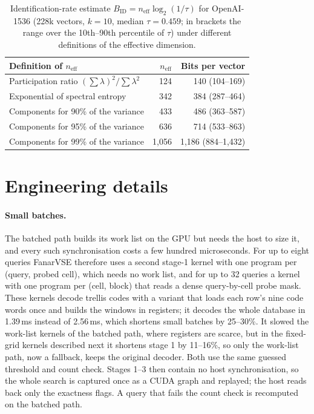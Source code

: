 \documentclass[10pt]{article}
\begin{document}
\begin{table}[!htbp]
\caption{Identification-rate estimate $B_{\mathrm{ID}}=n_{\mathrm{eff}}\log_2(1/\tau)$ for OpenAI-1536 (228k vectors, $k=10$, median $\tau=0.459$; in brackets the range over the 10th--90th percentile of $\tau$) under different definitions of the effective dimension.}
\label{tab:ident}
\small
\begin{tabular}{lrr}
\toprule
Definition of $n_{\mathrm{eff}}$ & $n_{\mathrm{eff}}$ & Bits per vector \\
\midrule
Participation ratio $(\sum\lambda)^2/\sum\lambda^2$ & 124 & 140 (104--169) \\
Exponential of spectral entropy & 342 & 384 (287--464) \\
Components for 90\% of the variance & 433 & 486 (363--587) \\
Components for 95\% of the variance & 636 & 714 (533--863) \\
Components for 99\% of the variance & 1{,}056 & 1{,}186 (884--1{,}432) \\
\bottomrule
\end{tabular}
\end{table}

\section{Engineering details}\label{sn:eng}
\paragraph{Small batches.} The batched path builds its work list on the GPU but needs the host to size it, and every such synchronisation costs a few hundred microseconds. For up to eight queries FanarVSE therefore uses a second stage-1 kernel with one program per (query, probed cell), which needs no work list, and for up to 32 queries a kernel with one program per (cell, block) that reads a dense query-by-cell probe mask. These kernels decode trellis codes with a variant that loads each row's nine code words once and builds the windows in registers; it decodes the whole database in 1.39\,ms instead of 2.56\,ms, which shortens small batches by 25--30\%. It slowed the work-list kernels of the batched path, where registers are scarce, but in the fixed-grid kernels described next it shortens stage 1 by 11--16\%, so only the work-list path, now a fallback, keeps the original decoder. Both use the same guessed threshold and count check. Stages 1--3 then contain no host synchronisation, so the whole search is captured once as a CUDA graph and replayed; the host reads back only the exactness flags. A query that fails the count check is recomputed on the batched path.
\end{document}
